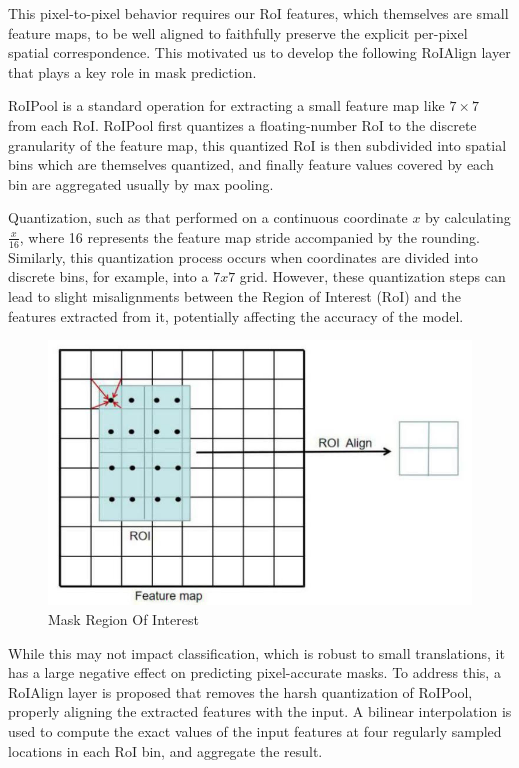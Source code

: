 This pixel-to-pixel behavior requires our RoI features, which themselves are small feature maps, to be well aligned to faithfully preserve the explicit 
per-pixel spatial correspondence. This motivated us to develop the following RoIAlign layer that plays a key role in mask prediction.

RoIPool is a standard operation for extracting a small feature map like \(7 \times 7\) from each RoI. RoIPool first quantizes a floating-number RoI to the 
discrete granularity of the feature map, this quantized RoI is then subdivided into spatial bins  which are themselves quantized, and finally feature 
values covered by each bin are aggregated usually by max pooling. 

Quantization, such as that performed on a continuous coordinate $x$ by calculating \(\frac{x}{16}\), where 16 represents the feature map stride accompanied
by the rounding. Similarly, this quantization process occurs when coordinates are divided into discrete bins, for example, into a $7x7$ grid. However, these 
quantization steps can lead to slight misalignments between the Region of Interest (RoI) and the features extracted from it, potentially affecting the accuracy 
of the model.

\begin{figure}[h!]
    \centering
    \includegraphics[scale=0.30]{Figures/mask-r-cnn-roi-align.png}
    \caption{Mask Region Of Interest}
    \label{fig:roi-align}
\end{figure}

While this may not impact classification, which is robust to small translations, it has a large negative effect on predicting pixel-accurate masks.
To address this, a RoIAlign layer is proposed that removes the harsh quantization of RoIPool, properly aligning the extracted features with the input. 
A bilinear interpolation is used to compute the exact values of the input features at four regularly sampled locations in each RoI bin, and aggregate 
the result.

